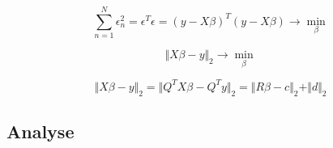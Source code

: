 
\begin{equation}
  \label{eq:minimization}
  \sum\limits^{N}_{n=1} \epsilon^2_n = \epsilon^T \epsilon = (y - X \beta)^T (y - X \beta) \rightarrow \min\limits_{\beta}
\end{equation}


\begin{equation}
  \label{eq:minimization_general}
  \Vert X\beta - y \Vert_2 \rightarrow \min\limits_{\beta}
\end{equation}

\begin{equation}
  \label{eq:orthogonal_transformation}
  \Vert X\beta - y \Vert_2 = \Vert Q^T X \beta - Q^T y \Vert_2 = \Vert R \beta - c \Vert_2 + \Vert d \Vert_2
\end{equation}

\subsection{Analyse}




